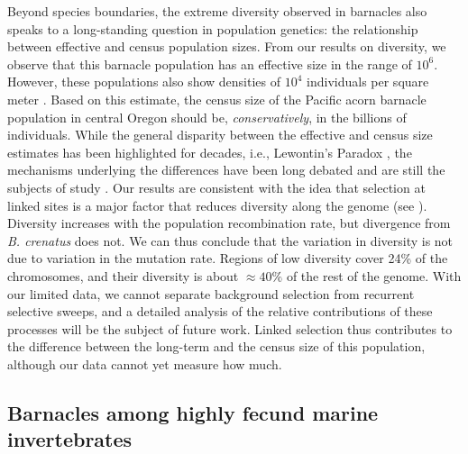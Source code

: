 Beyond species boundaries, the extreme diversity observed in barnacles also speaks to
a long-standing question in population genetics: the relationship between effective
and census population sizes. From our results on diversity, we
observe that this barnacle population has an effective size in the range of $10^{6}$.
However, these populations also show densities of $10^{4}$ individuals per square meter
\citep{menge_recruitment_2000}. Based on this estimate, the census size of the Pacific
acorn barnacle population in central Oregon should be, \emph{conservatively}, in the
billions of individuals.
While the general disparity between the effective and census size estimates
has been highlighted for decades, i.e., Lewontin's Paradox \citep{lewontin_genetic_1974},
the mechanisms underlying the differences have been long debated
\citep{gillespie_role_1999,gillespie_genetic_2000,smith_hitch-hiking_1974,
kimura_neutral_1983} and are still the subjects of study \citep{buffalo_quantifying_2021}.
Our results are consistent with the idea that selection at
linked sites is a major factor that reduces diversity along the \bgla{} genome
(see ).
Diversity increases with the population recombination rate, but divergence from
\textit{B. crenatus} does not.
We can thus conclude that the variation in diversity is not due to variation in the mutation rate.
Regions of low diversity cover 24\% of the chromosomes, and their diversity is about
$\approx40\%$ of the rest of the genome.
With our limited data, we cannot separate background selection from recurrent selective
sweeps, and a detailed analysis of the relative contributions of these processes will
be the subject of future work.
Linked selection thus contributes to the difference between the long-term \Ne{} and
the census size of this population, although our data cannot yet measure how much.
\vspace{0.1cm}

\subsection*{Barnacles among highly fecund marine invertebrates}

